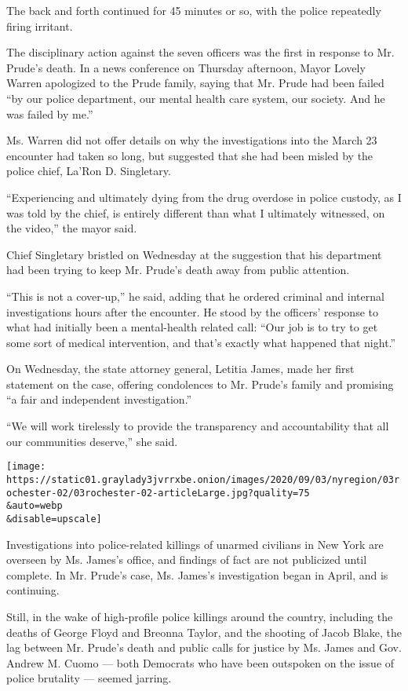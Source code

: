 The back and forth continued for 45 minutes or so, with the police
repeatedly firing irritant.

The disciplinary action against the seven officers was the first in
response to Mr. Prude's death. In a news conference on Thursday
afternoon, Mayor Lovely Warren apologized to the Prude family, saying
that Mr. Prude had been failed ``by our police department, our mental
health care system, our society. And he was failed by me.''

Ms. Warren did not offer details on why the investigations into the
March 23 encounter had taken so long, but suggested that she had been
misled by the police chief, La'Ron D. Singletary.

``Experiencing and ultimately dying from the drug overdose in police
custody, as I was told by the chief, is entirely different than what I
ultimately witnessed, on the video,'' the mayor said.

Chief Singletary bristled on Wednesday at the suggestion that his
department had been trying to keep Mr. Prude's death away from public
attention.

``This is not a cover-up,'' he said, adding that he ordered criminal and
internal investigations hours after the encounter. He stood by the
officers' response to what had initially been a mental-health related
call: ``Our job is to try to get some sort of medical intervention, and
that's exactly what happened that night.''

On Wednesday, the state attorney general, Letitia James, made her first
statement on the case, offering condolences to Mr. Prude's family and
promising ``a fair and independent investigation.''

``We will work tirelessly to provide the transparency and accountability
that all our communities deserve,'' she said.

\texttt{[image: https://static01.graylady3jvrrxbe.onion/images/2020/09/03/nyregion/03rochester-02/03rochester-02-articleLarge.jpg?quality=75\\\&auto=webp\\\&disable=upscale]}

Investigations into police-related killings of unarmed civilians in New
York are overseen by Ms. James's office, and findings of fact are not
publicized until complete. In Mr. Prude's case, Ms. James's
investigation began in April, and is continuing.

Still, in the wake of high-profile police killings around the country,
including the deaths of George Floyd and Breonna Taylor, and the
shooting of Jacob Blake, the lag between Mr. Prude's death and public
calls for justice by Ms. James and Gov. Andrew M. Cuomo --- both
Democrats who have been outspoken on the issue of police brutality ---
seemed jarring.

